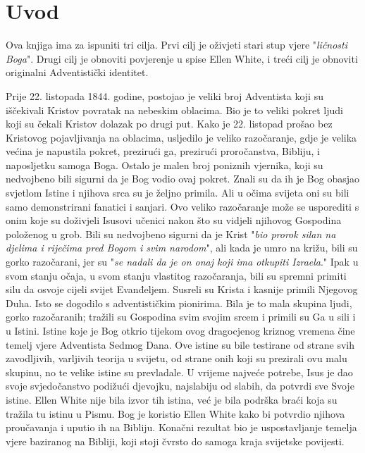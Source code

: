 \chapter*{Uvod}

Ova knjiga ima za ispuniti tri cilja. Prvi cilj je oživjeti stari stup vjere "\textit{ličnosti Boga}". Drugi cilj je obnoviti povjerenje u spise Ellen White, i treći cilj je obnoviti originalni Adventistički identitet.

Prije 22. listopada 1844. godine, postojao je veliki broj Adventista koji su iščekivali Kristov povratak na nebeskim oblacima. Bio je to veliki pokret ljudi koji su čekali Kristov dolazak po drugi put. Kako je 22. listopad prošao bez Kristovog pojavljivanja na oblacima, usljedilo je veliko razočaranje, gdje je velika većina je napustila pokret, prezirući ga, prezirući proročanstva, Bibliju, i naposljetku samoga Boga. Ostalo je malen broj poniznih vjernika, koji su nedvojbeno bili sigurni da je Bog vodio ovaj pokret. Znali su da ih je Bog obasjao svjetlom Istine i njihova srca su je željno primila. Ali u očima svijeta oni su bili samo demonstrirani fanatici i sanjari. Ovo veliko razočaranje može se usporediti s onim koje su doživjeli Isusovi učenici nakon što su vidjeli njihovog Gospodina položenog u grob. Bili su nedvojbeno sigurni da je Krist "\textit{bio prorok silan na djelima i riječima pred Bogom i svim narodom}", ali kada je umro na križu, bili su gorko razočarani, jer su "\textit{se nadali da je on onaj koji ima otkupiti Izraela}." Ipak u svom stanju očaja, u svom stanju vlastitog razočaranja, bili su spremni primiti silu da osvoje cijeli svijet Evanđeljem. Susreli su Krista i kasnije primili Njegovog Duha. Isto se dogodilo s adventističkim pionirima. Bila je to mala skupina ljudi, gorko razočaranih; tražili su Gospodina svim svojim srcem i primili su Ga u sili i u Istini. Istine koje je Bog otkrio tijekom ovog dragocjenog kriznog vremena čine temelj vjere Adventista Sedmog Dana. Ove istine su bile testirane od strane svih zavodljivih, varljivih teorija u svijetu, od strane onih koji su prezirali ovu malu skupinu, no te velike istine su prevladale. U vrijeme najveće potrebe, Isus je dao svoje svjedočanstvo podižući djevojku, najslabiju od slabih, da potvrdi sve Svoje istine. Ellen White nije bila izvor tih istina, već je bila podrška braći koja su tražila tu istinu u Pismu. Bog je koristio Ellen White kako bi potvrdio njihova proučavanja i uputio ih na Bibliju. Konačni rezultat bio je uspostavljanje temelja vjere baziranog na Bibliji, koji stoji čvrsto do samoga kraja svijetske povijesti.

